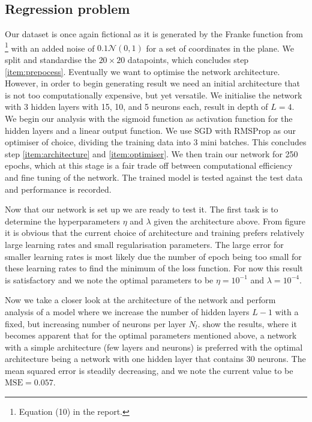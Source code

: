 \subsection{Regression problem}\label{sec:analysis_regression}


    Our dataset is once again fictional as it is generated by the Franke function from \projectOne\footnote{Equation (10) in the report.} with an added noise of $0.1 \mathcal{N}(0, 1)$ for a set of coordinates in the plane. We split and standardise the $20\times 20$ datapoints, which concludes step \ref{item:prepocess}. 
    Eventually we want to optimise the network architecture. However, in order to begin generating result we need an initial architecture that is not too computationally expensive, but yet versatile. We initialise the network with 3 hidden layers with 15, 10, and 5 neurons each, result in depth of $L=4$. We begin our analysis with the sigmoid function as activation function for the hidden layers and a linear output function. We use SGD with RMSProp as our optimiser of choice, dividing the training data into 3 mini batches. This concludes step \ref{item:architecture} and \ref{item:optimiser}.
    We then train our network for 250 epochs, which at this stage is a fair trade off between computational efficiency and fine tuning of the network. The trained model is tested against the test data and performance is recorded. 

    Now that our network is set up we are ready to test it. The first task is to determine the hyperparameters $\eta$ and $\lambda$ given the architecture above. From figure  it is obvious that the current choice of architecture and training prefers relatively large learning rates and small regularisation parameters. The large error for smaller learning rates is most likely due the number of epoch being too small for these learning rates to find the minimum of the loss function. For now this result is satisfactory and we note the optimal parameters to be $\eta=10^{-1}$ and $\lambda=10^{-4}$. 

    Now we take a closer look at the architecture of the network and perform analysis of a model where we increase the number of hidden layers $L-1$ with a fixed, but increasing number of neurons per layer $N_l$.  show the results, where it becomes apparent that for the optimal parameters mentioned above, a network with a simple architecture (few layers and neurons) is preferred with the optimal architecture being a network with one hidden layer that contains 30 neurons. The mean squared error is steadily decreasing, and we note the current value to be $\mathrm{MSE} = 0.057$. 

